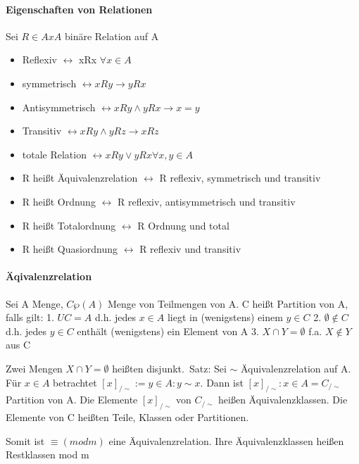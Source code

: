 \documentclass[10pt,landscape]{article}
\begin{document}
\begin{multicols}{3}
\paragraph{Eigenschaften von Relationen}
Sei $R\in AxA$ binäre Relation auf A
\begin{itemize}
    \item Reflexiv $\leftrightarrow$ xRx $\forall x \in A$
    \item symmetrisch $\leftrightarrow xRy \rightarrow yRx$
    \item Antisymmetrisch $\leftrightarrow xRy \wedge yRx \rightarrow x=y$
    \item Transitiv $\leftrightarrow xRy \wedge yRz \rightarrow xRz$
    \item totale Relation $\leftrightarrow xRy \vee yRx  \forall x,y \in A$
\end{itemize}
\begin{itemize}
    \item R heißt Äquivalenzrelation $\leftrightarrow$ R reflexiv, symmetrisch und transitiv
    \item R heißt Ordnung $\leftrightarrow$ R reflexiv, antisymmetrisch und transitiv
    \item R heißt Totalordnung $\leftrightarrow$ R Ordnung und total
    \item R heißt Quasiordnung $\leftrightarrow$ R reflexiv und transitiv
\end{itemize}

\paragraph{Äqivalenzrelation}
Sei A Menge, $C\wp (A)$ Menge von Teilmengen von A. C heißt Partition von A, falls gilt:
1. $UC=A$ d.h. jedes $x\in A$ liegt in (wenigstens) einem $y\in C$
2. $\emptyset \not \in C$ d.h. jedes $y\in C$ enthält (wenigstens) ein Element von A
3. $X \cap Y = \emptyset$ f.a. $X\not \in Y$ aus C

Zwei Mengen $X\cap Y = \emptyset$ heißten disjunkt.\
Satz: Sei $\sim$ Äquivalenzrelation auf A. Für $x\in A$ betrachtet $[x]_{/ \sim }:={y\in A: y \sim x}$. Dann ist ${[x]_{/ \sim }:x\in A}= C_{/ \sim }$ Partition von A. Die Elemente $[x]_{/ \sim }$ von $C_{/ \sim }$ heißen Äquivalenzklassen. Die Elemente von C heißten Teile, Klassen oder Partitionen.

Somit ist $\equiv(mod m)$ eine Äquivalenzrelation. Ihre Äquivalenzklassen heißen Restklassen mod m


\end{multicols}
\end{document}
